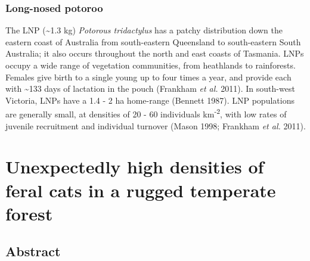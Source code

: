 \documentclass[11pt,a4paper,titlepage,twoside,openright]{style/unimelbthesis}
\begin{document}
\begin{mainmatter}
\hypertarget{long-nosed-potoroo}{%
\subsection{Long-nosed potoroo}\label{long-nosed-potoroo}}

The LNP (\textasciitilde1.3 kg) \emph{Potorous tridactylus} has a patchy distribution down the eastern coast of Australia from south-eastern Queensland to south-eastern South Australia; it also occurs throughout the north and east coasts of Tasmania. LNPs occupy a wide range of vegetation communities, from heathlands to rainforests. Females give birth to a single young up to four times a year, and provide each with \textasciitilde133 days of lactation in the pouch (Frankham \emph{et al.} 2011). In south-west Victoria, LNPs have a 1.4 - 2 ha home-range (Bennett 1987). LNP populations are generally small, at densities of 20 - 60 individuals km\textsuperscript{-2}, with low rates of juvenile recruitment and individual turnover (Mason 1998; Frankham \emph{et al.} 2011).

\hypertarget{otways17}{%
\chapter{Unexpectedly high densities of feral cats in a rugged temperate forest}\label{otways17}}

\hypertarget{abstract}{%
\section*{Abstract}\label{abstract}}


\end{mainmatter}
\end{document}
